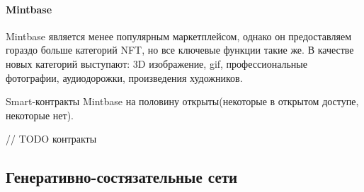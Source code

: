 \paragraph{Mintbase}

Mintbase является менее популярным маркетплейсом, однако он предоставляем гораздо больше категорий NFT, но все ключевые функции такие же. В качестве новых категорий выступают: 3D изображение, gif, профессиональные фотографии, аудиодорожки, произведения художников.

Smart-контракты Mintbase на половину открыты(некоторые в открытом доступе, некоторые нет)\cite{mintbasecontracts}.

// TODO контракты

\subsection{Генеративно-состязательные сети}
